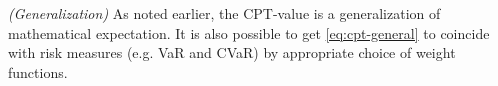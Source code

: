 %

\begin{remark}\textit{(Generalization)}
As noted earlier, the CPT-value is a generalization of mathematical expectation. 
It is also possible to get \eqref{eq:cpt-general} to coincide with risk measures (e.g. VaR and CVaR) by appropriate choice of weight functions.
\end{remark}

